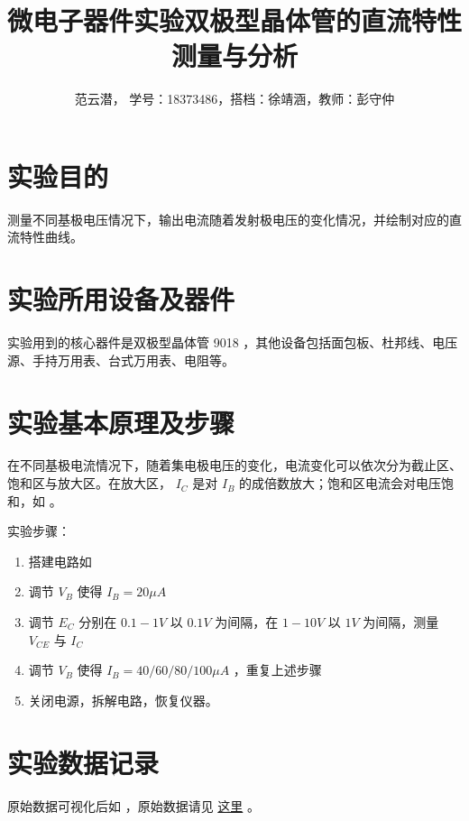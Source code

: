 \documentclass[lang=cn,11pt,a4paper,cite=authoryear]{elegantpaper}
\title{微电子器件实验\quad 双极型晶体管的直流特性测量与分析}
\author{范云潜， 学号：18373486，搭档：徐靖涵，教师：彭守仲}
\institute{微电子学院 184111 班}
\date{\zhdate{2020/10/21}}
\begin{document}
\maketitle


\section{实验目的}

测量不同基极电压情况下，输出电流随着发射极电压的变化情况，并绘制对应的直流特性曲线。

\section{实验所用设备及器件}

实验用到的核心器件是双极型晶体管 9018 ，其他设备包括面包板、杜邦线、电压源、手持万用表、台式万用表、电阻等。


\section{实验基本原理及步骤}

在不同基极电流情况下，随着集电极电压的变化，电流变化可以依次分为截止区、饱和区与放大区。在放大区， \(I_C\) 是对 \(I_B\) 的成倍数放大；饱和区电流会对电压饱和，如 。


实验步骤：

\begin{enumerate}
    \item 搭建电路如
    \item 调节 \(V_B\) 使得 \(I_B = 20 \mu A\) 
    \item 调节 \(E_C\) 分别在 \(0.1-1V\) 以 \(0.1V\) 为间隔，在 \(1-10V\) 以 \(1V\) 为间隔，测量 \(V_{CE}\) 与 \(I_C\) 
    \item 调节 \(V_B\) 使得 \(I_B = 40/60/80/100 \mu A\) ，重复上述步骤
    \item 关闭电源，拆解电路，恢复仪器。
\end{enumerate}


\section{实验数据记录}


原始数据可视化后如 ，原始数据请见 \href{https://github.com/PannenetsF/Mirco-Electronic-Device-Experiment/tree/main/homework/hw07/02bjt}{这里} 。
\end{document}
